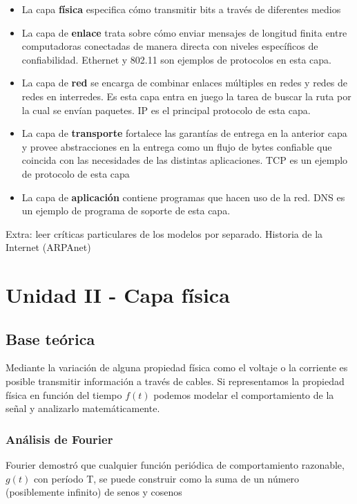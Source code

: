 \documentclass{book}
\begin{document}
	\begin{itemize}
		\item La capa \textbf{física} especifica cómo transmitir bits a través de diferentes medios
		\item La capa de \textbf{enlace} trata sobre cómo enviar mensajes de longitud finita entre computadoras conectadas de manera directa con niveles específicos de confiabilidad. Ethernet y 802.11 son ejemplos de protocolos en esta capa.
		\item La capa de \textbf{red} se encarga de combinar enlaces múltiples en redes y redes de redes en interredes. Es esta capa entra en juego la tarea de buscar la ruta por la cual se envían paquetes. IP es el principal protocolo de esta capa.
		\item La capa de \textbf{transporte} fortalece las garantías de entrega en la anterior capa y provee abstracciones en la entrega como un flujo de bytes confiable que coincida con las necesidades de las distintas aplicaciones. TCP es un ejemplo de protocolo de esta capa
		\item La capa de \textbf{aplicación} contiene programas que hacen uso de la red. DNS es un ejemplo de programa de soporte de esta capa.
	\end{itemize}
	
	Extra: leer críticas particulares de los modelos por separado.
	Historia de la Internet (ARPAnet)
	
	\chapter{Unidad II - Capa física}
	
	\section{Base teórica}
	Mediante la variación de alguna propiedad física como el voltaje o la corriente es posible transmitir información a través de cables. Si representamos la propiedad física en función del tiempo $f(t)$ podemos modelar el comportamiento de la señal y analizarlo matemáticamente.
	
	\subsection{Análisis de Fourier}
	Fourier demostró que cualquier función periódica de comportamiento razonable, $g(t)$ con período T, se puede construir como la suma de un número (posiblemente infinito) de senos y cosenos
	
\end{document}
